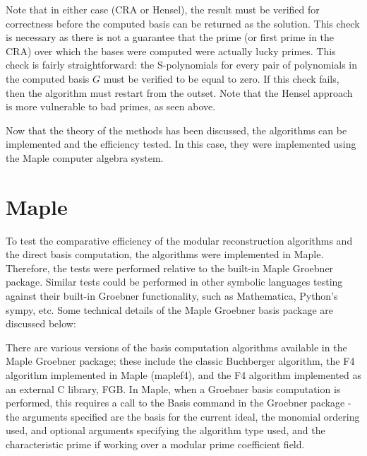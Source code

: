 \documentclass[letterpaper,12pt,titlepage,oneside,final]{book}
\begin{document}
Note that in either case (CRA or Hensel), the result must be verified for correctness before the computed basis can be returned as the solution.  This check is necessary as there is not a guarantee that the prime (or first prime in the CRA) over which the bases were computed were actually lucky primes.  This check is fairly straightforward: the S-polynomials for every pair of polynomials in the computed basis ${G}$ must be verified to be equal to zero.  If this check fails, then the algorithm must restart from the outset.  Note that the Hensel approach is more vulnerable to bad primes, as seen above.

Now that the theory of the methods has been discussed, the algorithms can be implemented and the efficiency tested.  In this case, they were implemented using the Maple computer algebra system.

\section{Maple}

To test the comparative efficiency of the modular reconstruction algorithms and the direct basis computation, the algorithms were implemented in Maple.  Therefore, the tests were performed relative to the built-in Maple Groebner package.  Similar tests could be performed in other symbolic languages testing against their built-in Groebner functionality, such as Mathematica, Python's sympy, etc.  Some technical details of the Maple Groebner basis package are discussed below:

There are various versions of the basis computation algorithms available in the Maple Groebner package; these include the classic Buchberger algorithm, the F4 algorithm implemented in Maple (maplef4), and the F4 algorithm implemented as an external C library, FGB.  In Maple, when a Groebner basis computation is performed, this requires a call to the Basis command in the Groebner package - the arguments specified are the basis for the current ideal, the monomial ordering used, and optional arguments specifying the algorithm type used, and the characteristic prime if working over a modular prime coefficient field.   
\end{document}
